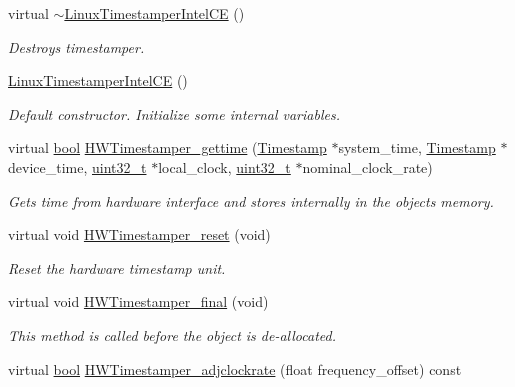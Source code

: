 \begin{DoxyCompactItemize}
virtual \hyperlink{class_linux_timestamper_intel_c_e_afa469296442c46520a4910f111869eb0}{$\sim$\+Linux\+Timestamper\+Intel\+CE} ()
\begin{DoxyCompactList}\small\item\em Destroys timestamper. \end{DoxyCompactList}\item 
\hyperlink{class_linux_timestamper_intel_c_e_a66574fb89b9d6f05e847a6269c79ae7a}{Linux\+Timestamper\+Intel\+CE} ()
\begin{DoxyCompactList}\small\item\em Default constructor. Initialize some internal variables. \end{DoxyCompactList}\item 
virtual \hyperlink{avb__gptp_8h_af6a258d8f3ee5206d682d799316314b1}{bool} \hyperlink{class_linux_timestamper_intel_c_e_a8db9570fc51b914ef4630a79a4947821}{H\+W\+Timestamper\+\_\+gettime} (\hyperlink{class_timestamp}{Timestamp} $\ast$system\+\_\+time, \hyperlink{class_timestamp}{Timestamp} $\ast$device\+\_\+time, \hyperlink{parse_8c_a6eb1e68cc391dd753bc8ce896dbb8315}{uint32\+\_\+t} $\ast$local\+\_\+clock, \hyperlink{parse_8c_a6eb1e68cc391dd753bc8ce896dbb8315}{uint32\+\_\+t} $\ast$nominal\+\_\+clock\+\_\+rate)
\begin{DoxyCompactList}\small\item\em Gets time from hardware interface and stores internally in the object\textquotesingle{}s memory. \end{DoxyCompactList}\item 
virtual void \hyperlink{class_common_timestamper_a1ee6bfcaf63bef07bbed1306e52e7203}{H\+W\+Timestamper\+\_\+reset} (void)
\begin{DoxyCompactList}\small\item\em Reset the hardware timestamp unit. \end{DoxyCompactList}\item 
virtual void \hyperlink{class_common_timestamper_a866fc2519a7b2a696e350ed05df53f90}{H\+W\+Timestamper\+\_\+final} (void)
\begin{DoxyCompactList}\small\item\em This method is called before the object is de-\/allocated. \end{DoxyCompactList}\item 
virtual \hyperlink{avb__gptp_8h_af6a258d8f3ee5206d682d799316314b1}{bool} \hyperlink{class_common_timestamper_a557b905a4f8bb20481c28c8dd33cfb21}{H\+W\+Timestamper\+\_\+adjclockrate} (float frequency\+\_\+offset) const 

\end{DoxyCompactItemize}
